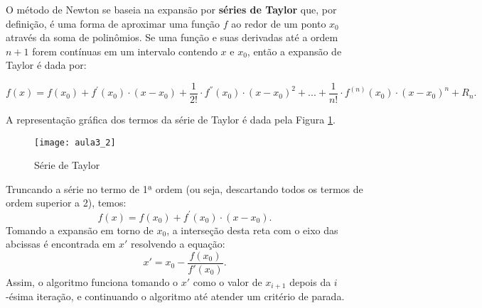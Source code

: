 O método de Newton se baseia na expansão por \textbf{séries de Taylor} que, por definição, é uma forma de aproximar uma função $f$ ao redor de um ponto $x_{0}$ através da soma de polinômios.
Se uma função e suas derivadas até a ordem $n+1$ forem contínuas
em um intervalo contendo $x$ e $x_{0}$, então a expansão de Taylor é dada por: 

\[
f(x)=f(x_{0})+f^{'}(x_{0})\cdot(x-x_{0})+\frac{1}{2!}\cdot f^{''}(x_{0})\cdot(x-x_{0})^{2}+...+\frac{1}{n!}\cdot f^{(n)}(x_{0})\cdot(x-x_{0})^{n}+R_{n}.
\]

A representação gráfica dos termos da série de Taylor é dada pela Figura \ref{fig:aula3_2}.

\begin{figure}[H]
\begin{centering}
\texttt{[image: aula3\_2]}\protect\caption{\label{fig:aula3_2} Série de Taylor }
\end{centering}
\end{figure}


Truncando a série no termo de 1ª ordem (ou seja, descartando todos os termos de ordem superior a 2), temos: 
\[
	f(x)=f(x_{0})+f^{'}(x_{0})\cdot(x-x_{0}).
\]
Tomando a expansão em torno de $x_0$, a interseção desta reta com o eixo das abcissas é encontrada em $x'$ resolvendo a equação: 
\[
	x' = x_0 - \dfrac{f(x_0)}{f'(x_0)} .
\]
Assim, o algoritmo funciona tomando o $x'$ como o valor de $x_{i+1}$ depois da $i$-ésima iteração, e continuando o algoritmo até atender um critério de parada. 


